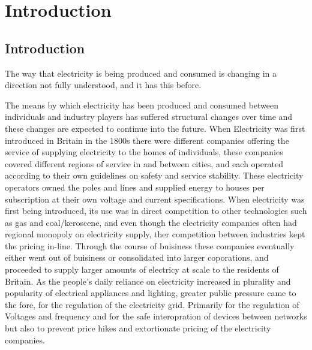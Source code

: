 \chapter{Introduction}
\label{cha:intro}



\section{Introduction}

The way that electricity is being produced and consumed is changing in a direction not fully understood, and it has this before.

The means by which electricity has been produced and consumed between individuals and industry players has suffered structural changes over time and these changes are expected to continue into the future.
When Electricity was first introduced in Britain in the 1800s there were different companies offering the service of supplying electricity to the homes of individuals, these companies covered different regions of service in and between cities, and each operated according to their own guidelines on safety and service stability.
These electricity operators owned the poles and lines and supplied energy to houses per subscription at their own voltage and current specifications.
When electricity was first being introduced, its use was in direct competition to other technologies such as gas and coal/keroscene, and even though the electricity companies often had regional monopoly on electricity supply, ther competition between industries kept the pricing in-line.
Through the course of buisiness these companies eventually either went out of buisiness or consolidated into larger coporations, and proceeded to supply larger amounts of electricy at scale to the residents of Britain.
As the people's daily reliance on electricity increased in plurality and popularity of electrical appliances and lighting, greater public pressure came to the fore, for the regulation of the electricity grid.
Primarily for the regulation of Voltages and frequency and for the safe interopration of devices between networks but also to prevent price hikes and extortionate pricing of the electricity companies.



